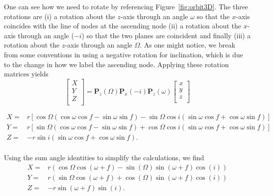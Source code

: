 \documentclass[modern]{aastex62}
\begin{document}
One can see how we need to rotate by referencing Figure~\ref{fig:orbit3D}. The three rotations are (i) a rotation about the $z$-axis through an angle $\omega$ so that the $x$-axis coincides with the line of nodes at the ascending node (ii) a rotation about the $x$-axis through an angle ($-i$) so that the two planes are coincident and finally (iii) a rotation about the $z$-axis through an angle $\Omega$. As one might notice, we break from some conventions \citep[e.g.,][]{Murray:2010} in using a negative rotation for inclination, which is due to the change in how we label the ascending node. Applying these rotation matrices yields
\begin{equation}
  \left [ \begin{array}{c}
  X \\
  Y \\
  Z \\
\end{array}
  \right ] =
  \boldsymbol{P}_z (\Omega) \boldsymbol{P}_x(-i) \boldsymbol{P}_z(\omega)
  \left [
  \begin{array}{c}
  x \\
  y \\
  z \\
  \end{array}
  \right]
\end{equation}

\begin{equation}
  \begin{array}{lc}
    X =& r [ \cos \Omega (\cos \omega \cos f - \sin \omega \sin f)  - \sin \Omega  \cos i (\sin \omega \cos f + \cos \omega \sin f) ] \\
    Y =& r [ \sin \Omega (\cos \omega \cos f - \sin \omega \sin f) + \cos \Omega \cos i(\sin \omega \cos f + \cos \omega \sin f) ] \\
    Z =& - r \sin i (\sin \omega \cos f + \cos \omega \sin f).\\
\end{array}
\label{eqn:Z}
\end{equation}


Using the sum angle identities to simplify the calculations, we find
\begin{equation}
  \begin{array}{lc}
    X =& r (\cos \Omega \cos(\omega + f) - \sin(\Omega) \sin(\omega + f) \cos(i)) \\
    Y =& r (\sin \Omega \cos(\omega + f) + \cos(\Omega) \sin(\omega + f) \cos(i)) \\
    Z =& - r \sin(\omega + f) \sin(i).\\
\end{array}
\label{eqn:Z}
\end{equation}
\end{document}
